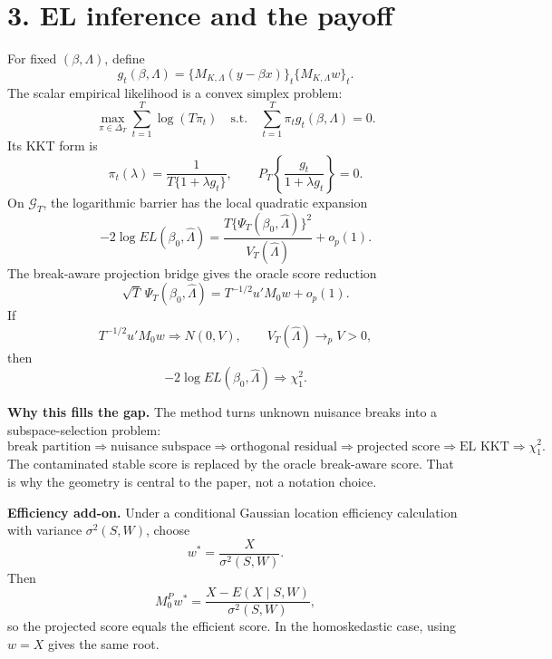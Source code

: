 \documentclass[11pt]{article}
\begin{document}
\newpage
\section*{3. EL inference and the payoff}

For fixed \((\beta,\Lambda)\), define
\[
    g_t(\beta,\Lambda)
    =
    \{M_{K,\Lambda}(y-\beta x)\}_t\{M_{K,\Lambda}w\}_t .
\]
The scalar empirical likelihood is a convex simplex problem:
\[
    \max_{\pi\in\Delta_T}\sum_{t=1}^T\log(T\pi_t)
    \quad\text{s.t.}\quad
    \sum_{t=1}^T\pi_t g_t(\beta,\Lambda)=0.
\]
Its KKT form is
\[
    \pi_t(\lambda)=\frac{1}{T\{1+\lambda g_t\}},
    \qquad
    P_T\left\{\frac{g_t}{1+\lambda g_t}\right\}=0.
\]
On \(\mathcal G_T\), the logarithmic barrier has the local quadratic expansion
\[
    -2\log EL(\beta_0,\widehat\Lambda)
    =
    \frac{T\{\Psi_T(\beta_0,\widehat\Lambda)\}^2}
         {V_T(\widehat\Lambda)}
    +o_p(1).
\]
The break-aware projection bridge gives the oracle score reduction
\[
    \sqrt T\,\Psi_T(\beta_0,\widehat\Lambda)
    =
    T^{-1/2}u'M_0w+o_p(1).
\]
If
\[
    T^{-1/2}u'M_0w\Rightarrow N(0,V),\qquad
    V_T(\widehat\Lambda)\to_p V>0,
\]
then
\[
    -2\log EL(\beta_0,\widehat\Lambda)\Rightarrow\chi_1^2 .
\]

\textbf{Why this fills the gap.} The method turns unknown nuisance breaks into
a subspace-selection problem:
\[
    \text{break partition}
    \Rightarrow
    \text{nuisance subspace}
    \Rightarrow
    \text{orthogonal residual}
    \Rightarrow
    \text{projected score}
    \Rightarrow
    \text{EL KKT}
    \Rightarrow
    \chi_1^2 .
\]
The contaminated stable score is replaced by the oracle break-aware score. That
is why the geometry is central to the paper, not a notation choice.

\textbf{Efficiency add-on.} Under a conditional Gaussian location efficiency
calculation with variance \(\sigma^2(S,W)\), choose
\[
    w^*=\frac{X}{\sigma^2(S,W)}.
\]
Then
\[
    M_0^Pw^*
    =
    \frac{X-E(X\mid S,W)}{\sigma^2(S,W)},
\]
so the projected score equals the efficient score. In the homoskedastic case,
using \(w=X\) gives the same root.
\end{document}
